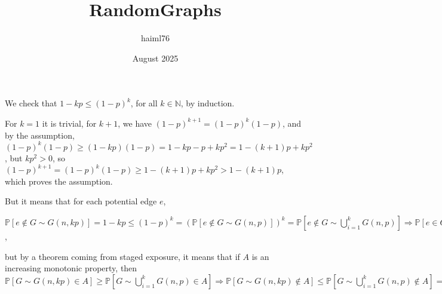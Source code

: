 \documentclass{article}
\title{RandomGraphs}
\author{haiml76 }
\date{August 2025}
\begin{document}
\maketitle

\section{}
\subsection{}
\subsection{}
We check that $1-kp\leq{(1-p)^k}$, for all $k\in\mathbb{N}$, by induction.

For $k=1$ it is trivial, for $k+1$, we have $(1-p)^{k+1}=(1-p)^k(1-p)$, and by the assumption, $(1-p)^k(1-p)\geq{(1-kp)(1-p)}=1-kp-p+kp^2=1-(k+1)p+kp^2$, but $kp^2>0$, so $(1-p)^{k+1}=(1-p)^k(1-p)\geq{1-(k+1)p+kp^2}>1-(k+1)p$, which proves the assumption.

But it means that for each potential edge $e$, 

$\mathbb{P}[e\notin{G\sim{G(n,kp)}}]=1-kp\leq(1-p)^k=(\mathbb{P}[e\notin{G\sim{G(n,p)}}])^k=\mathbb{P}[e\notin{G\sim\bigcup_{i=1}^{k}G(n,p)}]\Rightarrow{\mathbb{P}[e\in{G\sim{G(n,kp)}}]\geq{\mathbb{P}[e\in{G\sim\bigcup_{i=1}^{k}G(n,p)]}}}$, 

but by a theorem coming from staged exposure, it means that if $A$ is an increasing monotonic property, then $\mathbb{P}[G\sim{G(n,kp)}\in{A}]\geq{\mathbb{P}[G\sim\bigcup_{i=1}^{k}G(n,p)\in{A}]}\Rightarrow{\mathbb{P}[G\sim{G(n,kp)}\notin{A}]\leq{\mathbb{P}[G\sim\bigcup_{i=1}^{k}G(n,p)\notin{A}]}=(\mathbb{P}[G\sim{G(n,p)}\notin{A}]})^k$
\end{document}
